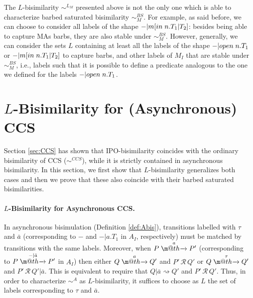 \documentclass[copyright,creativecommons]{eptcs}
\makeatletter
\def\tr#1{\stackrel{#1}{\to}}
\let\oldrightarrow\to
\renewcommand{\to}[1][]{\ifthenelse{\equal{#1}{}}{\oldrightarrow}{\ensuremath{\xrightarrow{{}_{#1}}}}}
\def \rightarrowfill{\m@th\mathord{\smash-}\mkern-6mu\cleaders\hbox{$\mkern-2mu\mathord{\smash-}\mkern-2mu$}\hfill
  \mkern-6mu\mathord\rightarrow}
\newcommand{\bsbis}{\sim^{BS}}
\def\tr#1{\stackrel{#1}{\rightarrowfill}}
\newcommand{\react}{\rightsquigarrow}
\newcommand{\<}{\langle}
\renewcommand{\>}{\rangle}
\def\tr#1{\stackrel{#1}{\rightarrowfill}}
\def \rightarrowfill{\m@th\mathord{\smash-}\mkern-6mu\cleaders\hbox{$\mkern-2mu\mathord{\smash-}\mkern-2mu$}\hfill
  \mkern-6mu\mathord\rightarrow}
\makeatother
\begin{document}
The $L$-bisimilarity $\sim^{L_{M}}$ presented above is not the only
one which is able to characterize barbed saturated bisimilarity
$\bsbis_{\scriptscriptstyle{M}}$. For example, as said before, we
can choose to consider all labels of the shape $-|m[in \hspace{1mm}
n.T_1|T_2]$: besides being able to capture MAs barbs, they are
also stable under $\bsbis_{\scriptscriptstyle{M}}$. However,
generally, we can consider the sets $L$ containing at least all
the labels of the shape $-|open \hspace{1mm} n.T_1$ or $-|m[in
\hspace{1mm} n.T_1|T_2]$ to capture barbs, and other labels of $M_I$
that are stable under $\bsbis_{\scriptscriptstyle{M}}$, i.e., labels
such that it is possible to define a predicate analogous to the one
we defined for the labels $-|open \hspace{1mm} n.T_1$.



\section{$L$-Bisimilarity for (Asynchronous) CCS} \label{sec:L-BisCCS}

Section \ref{sec:CCS} has shown that IPO-bisimilarity coincides with
the ordinary bisimilarity of CCS ($\sim^{CCS}$), while it is
strictly contained in asynchronous bisimilarity. In this section, we
first show that $L$-bisimilarity generalizes both cases and then we
prove that these also coincide with their barbed saturated
bisimilarities.

\paragraph{$L$-Bisimilarity for Asynchronous CCS.}
In asynchronous bisimulation (Definition \ref{def:Abis}),
transitions labelled with $\tau$ and $\bar{a}$ (corresponding to $-$
and $-|a.T_1$ in $A_I$, respectively) must be matched by transitions
with the same labels. Moreover, when $P \tr{a}P'$ (corresponding to
$P \tr{-|\bar{a}}P'$ in $A_I$) then either $Q\tr{a}Q'$ and $P'\,
\mathcal R\,Q'$ or $Q\tr{\tau}Q'$ and $P'\, \mathcal R \, Q' |
\bar{a}$. This is equivalent to require that $Q | \bar{a} \react Q'$
and $P'\, \mathcal R \, Q'$.
Thus, in order to characterize $\sim^A$ as $L$-bisimilarity, it
suffices to choose as $L$ the set of labels corresponding to $\tau$
and $\bar{a}$.
\end{document}

